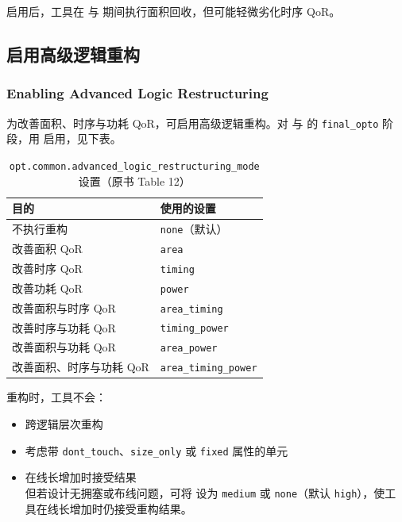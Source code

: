 启用后，工具在  与  期间执行面积回收，但可能轻微劣化时序 QoR。

\subsection{启用高级逻辑重构}
\subsubsection*{Enabling Advanced Logic Restructuring}

为改善面积、时序与功耗 QoR，可启用高级逻辑重构。对  与  的 \texttt{final\_opto} 阶段，用  启用，见下表。

\begin{table}[htbp]
\centering
\caption{\texttt{opt.common.advanced\_logic\_restructuring\_mode} 设置（原书 Table 12）}
\label{tab:ch2b-adv-restruct}
\begin{tabularx}{\textwidth}{@{}X l@{}}
\toprule
\textbf{目的} & \textbf{使用的设置} \\
\midrule
不执行重构 & \texttt{none}（默认） \\
改善面积 QoR & \texttt{area} \\
改善时序 QoR & \texttt{timing} \\
改善功耗 QoR & \texttt{power} \\
改善面积与时序 QoR & \texttt{area\_timing} \\
改善时序与功耗 QoR & \texttt{timing\_power} \\
改善面积与功耗 QoR & \texttt{area\_power} \\
改善面积、时序与功耗 QoR & \texttt{area\_timing\_power} \\
\bottomrule
\end{tabularx}
\end{table}

重构时，工具不会：
\begin{itemize}
  \item 跨逻辑层次重构
  \item 考虑带 \texttt{dont\_touch}、\texttt{size\_only} 或 \texttt{fixed} 属性的单元
  \item 在线长增加时接受结果\\
        但若设计无拥塞或布线问题，可将  设为 \texttt{medium} 或 \texttt{none}（默认 \texttt{high}），使工具在线长增加时仍接受重构结果。
\end{itemize}

